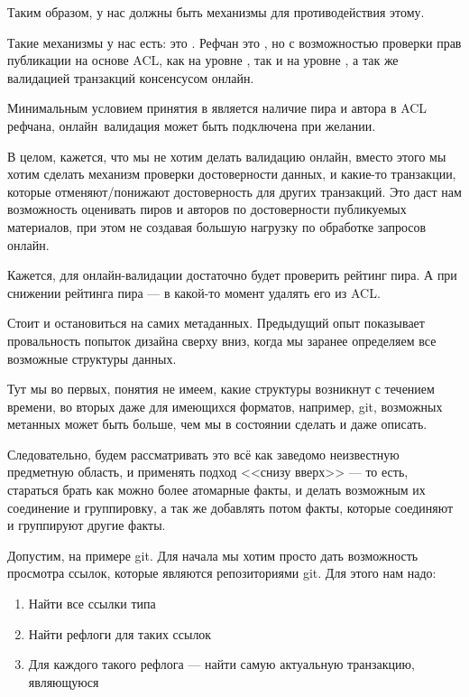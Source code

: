 Таким образом, у нас должны быть механизмы для противодействия этому.

Такие механизмы у нас есть: это . Рефчан это
 , но с возможностью
проверки прав публикации на основе ACL, как на уровне , так и
на уровне , а так же валидацией транзакций консенсусом
онлайн.

Минимальным условием принятия  в
 является наличие пира и автора в ACL рефчана,
онлайн~валидация может быть подключена при желании.

В целом, кажется, что мы не хотим делать валидацию онлайн, вместо этого мы хотим
сделать механизм проверки достоверности данных, и какие-то транзакции, которые
отменяют/понижают достоверность для других транзакций. Это даст нам возможность
оценивать пиров и авторов по достоверности публикуемых материалов, при этом не
создавая большую нагрузку  по обработке запросов онлайн.

Кажется, для онлайн-валидации достаточно будет проверить рейтинг пира. А при
снижении рейтинга пира --- в какой-то момент удалять его из ACL.

Стоит и остановиться на самих метаданных. Предыдущий опыт показывает
провальность попыток дизайна сверху вниз, когда мы заранее  определяем все
возможные структуры данных.

Тут мы во первых, понятия не имеем, какие структуры возникнут с течением
времени, во вторых даже для имеющихся форматов, например, git, возможных
метанных может быть больше, чем мы в состоянии сделать и даже описать.

Следовательно, будем рассматривать это всё как заведомо неизвестную предметную
область, и применять подход <<снизу вверх>> --- то есть, стараться брать как
можно более атомарные факты, и делать возможным их соединение и группировку, а
так же добавлять потом факты, которые соединяют и группируют другие факты.

Допустим, на примере git. Для начала мы хотим просто дать возможность просмотра
ссылок, которые являются репозиториями git. Для этого нам надо:

\begin{enumerate}
  \item Найти все ссылки типа 
  \item Найти рефлоги для таких ссылок
  \item Для каждого такого рефлога --- найти самую
        актуальную транзакцию, являющуюся 
\end{enumerate}

